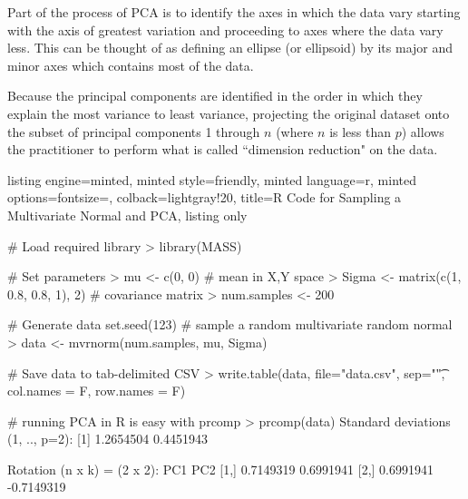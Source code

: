 \documentclass{tufte-handout}
\begin{document}
\begin{marginfigure}
\caption{Part of the process of PCA is to identify the axes in which the data vary starting with the axis of greatest variation 
and proceeding to axes where the data vary less. This can be 
thought of as defining an ellipse (or ellipsoid) by its major and minor axes which contains most of the data.}
\end{marginfigure}


Because the principal components are identified in the order in which they explain 
the most variance to least variance, projecting the original dataset onto the subset of 
principal components 1 through $n$ (where $n$ is less than $p$) allows the practitioner to perform what is called ``dimension reduction"
on the data. 

\begin{tcblisting}{
  listing engine=minted, 
  minted style=friendly, 
  minted language=r, 
  minted options={fontsize=\footnotesize}, 
  colback=lightgray!20, 
  title=R Code for Sampling a Multivariate Normal and PCA, 
  listing only
  }
  
# Load required library
> library(MASS)

# Set parameters
> mu <- c(0, 0) # mean in X,Y space
> Sigma <- matrix(c(1, 0.8, 0.8, 1), 2) # covariance matrix
> num.samples <- 200

# Generate data
set.seed(123)
# sample a random multivariate random normal
> data <- mvrnorm(num.samples, mu, Sigma) 

# Save data to tab-delimited CSV
> write.table(data, file="data.csv", sep="\t", col.names = F, 
  row.names = F)

# running PCA in R is easy with prcomp
> prcomp(data) 
Standard deviations (1, .., p=2):
[1] 1.2654504 0.4451943

Rotation (n x k) = (2 x 2):
           PC1        PC2
[1,] 0.7149319  0.6991941
[2,] 0.6991941 -0.7149319
\end{tcblisting}
\end{document}

